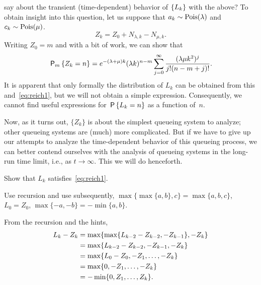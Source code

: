 \documentclass[stochastic-or.tex]{subfiles}
\begin{document}
 say about the transient (time-dependent) behavior of $\{\L_k\}$ with the above?
To obtain insight into this question, let us suppose that $a_k\sim \Pois{\lambda}$ and $c_k \sim \Pois{\mu}$.
\begin{equation*}
 Z_k = Z_0+N_{\lambda, k} - N_{\mu, k}.
\end{equation*}
Writing $Z_0=m$ and with a bit of work, we can show that
\begin{equation}\label{eq:rw2}
 \PP{m}{Z_k=n}
= e^{-(\lambda+\mu)k} (\lambda k)^{n-m} \sum_{j=0}^\infty
\frac{(\lambda\mu k^2)^j} {j!(n-m+j)!}.
\end{equation}
It is apparent that only formally the distribution of $L_{k}$ can be obtained from this and~\cref{eq:reich1}, but we will not obtain a simple expression.
Consequently, we cannot find useful expressions for $\P{L_k=n}$ as a function of~$n$.

Now, as it turns out, $\{Z_k\}$ is about the simplest queueing system to analyze; other queueing systems are (much) more complicated.
But if we have to give up our attempts to analyze the time-dependent behavior of this queueing process, we can better contend ourselves with the analysis of queueing systems in the long-run time limit, i.e., as $t\to\infty$. This we will do henceforth.


\begin{exercise}\label{ex:l-133}
Show that $L_k$ satisfies~\cref{eq:reich1}.
\begin{hint}
  Use recursion and use subsequently,
$\max\{\max\{a,b\}, c\} = \max\{a,b,c\}$, $L_0 = Z_0$, $\max\{-a, -b \} = -\min\{a,b\}$.
\end{hint}
\begin{solution}
From the recursion and the hints,
\begin{equation*}
 \begin{split}
 L_k - Z_{k}
&= \max\{\max\{\L_{k-2} - Z_{k-2}, -Z_{k-1}\}, -Z_k\} \\
&= \max\{\L_{k-2} - Z_{k-2}, -Z_{k-1}, -Z_k\} \\
&= \max\{\L_{0} - Z_{0}, -Z_1, \ldots, -Z_k\} \\
&= \max\{0, -Z_1, \ldots, -Z_k\} \\
&= - \min\{0, Z_1, \ldots, Z_k\}.
 \end{split}
 \end{equation*}
\end{solution}
\end{exercise}
\end{document}
